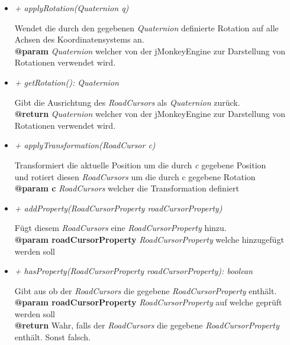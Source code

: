 \begin{itemize}
            \item  \textit{+ applyRotation(Quaternion q)}
                \begin{leftbar}[0.9\linewidth]
                    Wendet die durch den gegebenen \textit{Quaternion} definierte Rotation auf alle Achsen des Koordinatensystems an.\\
                    \textbf{@param} \textit{Quaternion} welcher von der jMonkeyEngine zur Darstellung von Rotationen verwendet wird.
                \end{leftbar}

            \item  \textit{+ getRotation(): Quaternion}
                \begin{leftbar}[0.9\linewidth]
                    Gibt die Ausrichtung des \textit{RoadCursors} als \textit{Quaternion} zurück.\\
                    \textbf{@return} \textit{Quaternion} welcher von der jMonkeyEngine zur Darstellung von Rotationen verwendet wird.
                \end{leftbar}

            \item  \textit{+ applyTransformation(RoadCursor c)}
                \begin{leftbar}[0.9\linewidth]
                    Transformiert die aktuelle Position um die durch \textit{c} gegebene Position\\
                    und rotiert diesen \textit{RoadCursors} um die durch c gegebene Rotation \\
                    \textbf{@param c} \textit{RoadCursors} welcher die Transformation definiert
                \end{leftbar}

            \item  \textit{+ addProperty(RoadCursorProperty roadCursorProperty)}
                \begin{leftbar}[0.9\linewidth]
                    Fügt diesem \textit{RoadCursors} eine \textit{RoadCursorProperty} hinzu.\\
                    \textbf{@param roadCursorProperty} \textit{RoadCursorProperty} welche hinzugefügt werden soll
                \end{leftbar}
            
            \item  \textit{+ hasProperty(RoadCursorProperty roadCursorProperty): boolean}
                \begin{leftbar}[0.9\linewidth]
                    Gibt aus ob der \textit{RoadCursors} die gegebene \textit{RoadCursorProperty} enthält.\\
                    \textbf{@param roadCursorProperty} \textit{RoadCursorProperty} auf welche geprüft werden soll\\
                    \textbf{@return} Wahr, falls der \textit{RoadCursors} die gegebene \textit{RoadCursorProperty} enthält. Sonst falsch.
                \end{leftbar}


\end{itemize}
